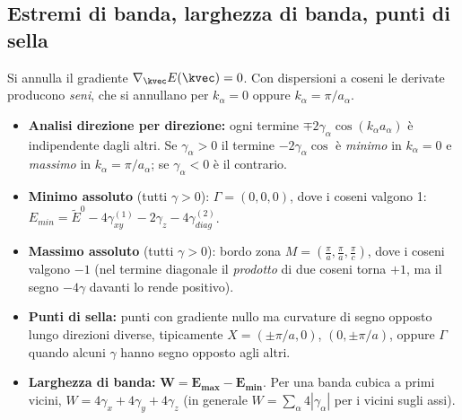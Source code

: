 \pagebreak

\subsection{Estremi di banda, larghezza di banda, punti di sella}
Si annulla il gradiente $\nabla_\kvec E(\kvec)=0$. Con dispersioni a coseni le derivate producono \emph{seni}, che si annullano per $k_\alpha = 0$ oppure $k_\alpha = \pi/a_\alpha$.
\begin{itemize}
  \item \textbf{Analisi direzione per direzione:} ogni termine $\mp 2\gamma_\alpha\cos(k_\alpha a_\alpha)$ è indipendente dagli altri. Se $\gamma_\alpha>0$ il termine $-2\gamma_\alpha\cos$ è \emph{minimo} in $k_\alpha=0$ e \emph{massimo} in $k_\alpha=\pi/a_\alpha$; se $\gamma_\alpha<0$ è il contrario.
  \item \textbf{Minimo assoluto} (tutti $\gamma>0$): $\Gamma=(0,0,0)$, dove i coseni valgono 1:
  $E_{min}=\tilde E^0 - 4\gamma_{xy}^{(1)}-2\gamma_z-4\gamma_{diag}^{(2)}$.
  \item \textbf{Massimo assoluto} (tutti $\gamma>0$): bordo zona $M=\left(\frac{\pi}{a},\frac{\pi}{a},\frac{\pi}{c}\right)$, dove i coseni valgono $-1$ (nel termine diagonale il \emph{prodotto} di due coseni torna $+1$, ma il segno $-4\gamma$ davanti lo rende positivo).
  \item \textbf{Punti di sella:} punti con gradiente nullo ma curvature di segno opposto lungo direzioni diverse, tipicamente $X=(\pm\pi/a,0)$, $(0,\pm\pi/a)$, oppure $\Gamma$ quando alcuni $\gamma$ hanno segno opposto agli altri.
  \item \textbf{Larghezza di banda:} $\bm{W = E_{max}-E_{min}}$. Per una banda cubica a primi vicini, $W = 4\gamma_x+4\gamma_y+4\gamma_z$ (in generale $W=\sum_\alpha 4|\gamma_\alpha|$ per i vicini sugli assi).
\end{itemize}



